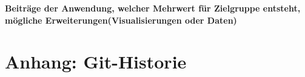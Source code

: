 \documentclass[usegeometry=true]{scrartcl}
\begin{document}
\textbf{Beiträge der Anwendung, welcher Mehrwert für Zielgruppe entsteht, mögliche Erweiterungen(Visualisierungen oder Daten)}

\newpage

\setcounter{page}{4}
\section*{Anhang: Git-Historie}

\printbibliography
\end{document}
